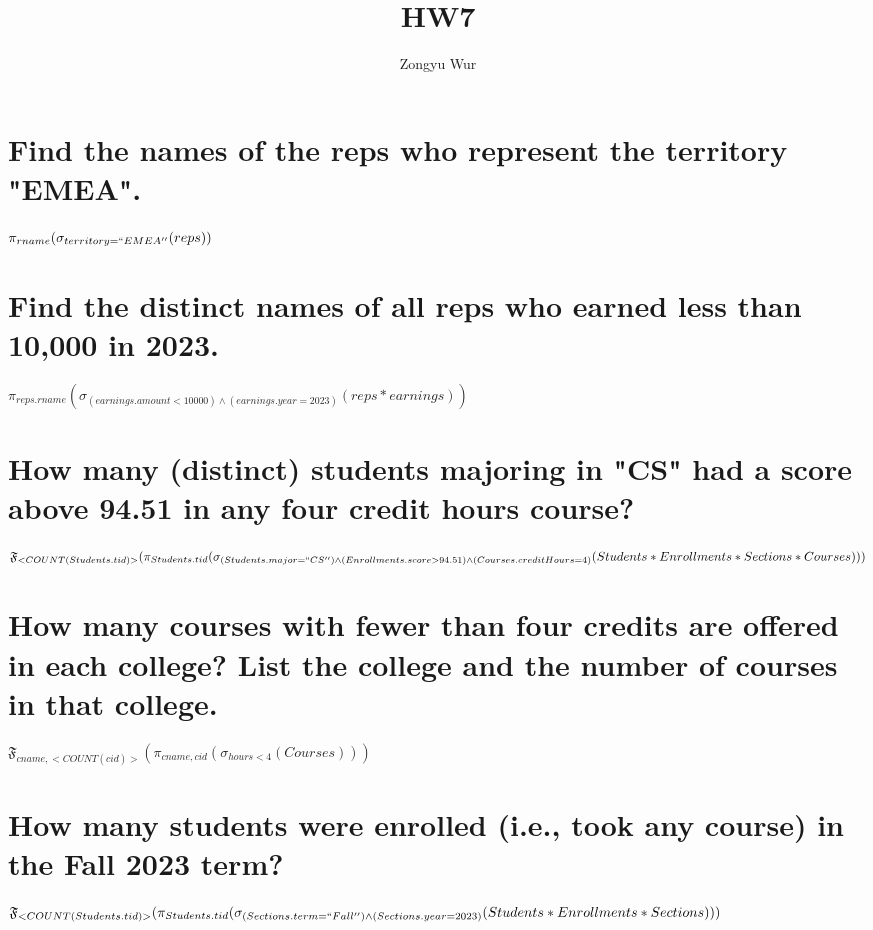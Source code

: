 \documentclass[11pt, oneside]{article}   	%
\title{HW7}
\author{Zongyu Wur}
\begin{document}
\maketitle

\section{Find the names of the reps who represent the territory "EMEA".}
$\pi_{rname}(\sigma_{territory=``EMEA''}(rep s))$

\section{Find the distinct names of all reps who earned less than 10,000 in 2023.}
$\pi_{reps.rname}(\sigma_{(earnings.amount < 10000)\wedge(earnings.year = 2023)}(reps * earnings))$

\section{How many (distinct) students majoring in "CS" had a score above 94.51 in any four credit hours course?}
$\mathfrak{F}_{<COUNT(Students.tid)>}(\pi_{Students.tid}(\sigma_{(Students.major = ``CS'')\wedge(Enrollments.score > 94.51)\wedge (Courses.creditHours = 4)}(Students *  Enrollments * Sections *  Courses)))$

\section{How many courses with fewer than four credits are offered in each college? List the college and the number of courses in that college.}
$\mathfrak{F}_{cname, <COUNT(cid)>}(\pi_{cname, cid}(\sigma_{hours < 4}(Courses)))$

\section{How many students were enrolled (i.e., took any course) in the Fall 2023 term?}
$\mathfrak{F}_{<COUNT(Students.tid)>}(\pi_{Students.tid}(\sigma_{(Sections.term = ``Fall'')\wedge(Sections.year = 2023)}(Students * Enrollments * Sections)))$
\end{document}
